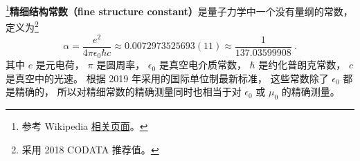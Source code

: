 

\footnote{参考 Wikipedia \href{https://en.wikipedia.org/wiki/Fine-structure_constant}{相关页面}。}\textbf{精细结构常数（fine structure constant）}是量子力学中一个没有量纲的常数， 定义为\footnote{采用 2018 CODATA 推荐值。}
\begin{equation}\label{eq_FinStr_1}
\alpha = \frac{e^2}{4\pi\epsilon_0\hbar c} \approx 0.0072973525693(11) \approx \frac{1}{137.03599908}~.
\end{equation}
其中 $e$ 是元电荷， $\pi$ 是圆周率， $\epsilon_0$ 是真空电介质常数， $\hbar$ 是约化普朗克常数， $c$ 是真空中的光速。 %
根据 2019 年采用的国际单位制最新标准， 这些常数除了 $\epsilon_0$ 都是精确的， 所以对精细常数的精确测量同时也相当于对 $\epsilon_0$ 或 $\mu_0$ 的精确测量。
